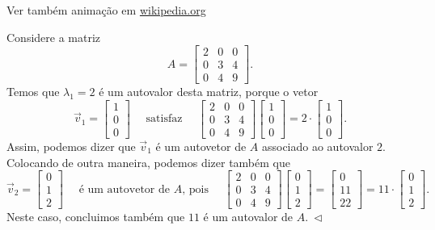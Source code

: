 \noindent Ver também animação em \href{https://en.wikipedia.org/wiki/Eigenvalues_and_eigenvectors#Matrix_examples}{wikipedia.org}

\begin{ex}
	Considere a matriz
	\begin{equation}
	A={\begin{bmatrix}2&0&0\\0&3&4\\0&4&9\end{bmatrix}}.
	\end{equation} Temos que $\lambda_1 = 2$ é um autovalor desta matriz, porque o vetor
	\begin{equation}
	\vec{v}_1 =
	{\begin{bmatrix}1\\0\\0\end{bmatrix}} \quad \text{ satisfaz } \quad {\begin{bmatrix}2&0&0\\0&3&4\\0&4&9\end{bmatrix}} {\begin{bmatrix}1\\0\\0\end{bmatrix}} = 2 \cdot {\begin{bmatrix}1\\0\\0\end{bmatrix}}.
	\end{equation} Assim, podemos dizer que $\vec{v}_1$ é um autovetor de $A$ associado ao autovalor $2$. Colocando de outra maneira, podemos dizer também que
	\begin{equation}
	\vec{v}_2 =
	{\begin{bmatrix}0\\1\\2\end{bmatrix}} \quad \text{ é um autovetor de $A$, pois } \quad {\begin{bmatrix}2&0&0\\0&3&4\\0&4&9\end{bmatrix}} {\begin{bmatrix}0\\1\\2\end{bmatrix}} = {\begin{bmatrix}0\\11\\22\end{bmatrix}} = 11 \cdot {\begin{bmatrix}0\\1\\2\end{bmatrix}}.
	\end{equation} Neste caso, concluimos também que $11$ é um autovalor de $A. \ \lhd$
\end{ex}

